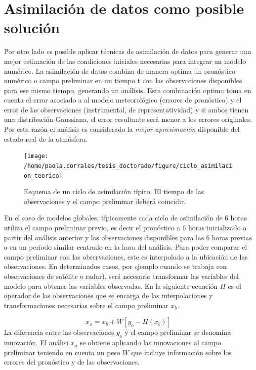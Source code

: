 \documentclass[12pt,twoside]{reedthesis}
\begin{document}
\hypertarget{asimilaciuxf3n-de-datos-como-posible-soluciuxf3n}{%
\section{Asimilación de datos como posible solución}\label{asimilaciuxf3n-de-datos-como-posible-soluciuxf3n}}

Por otro lado es posible aplicar técnicas de asimilación de datos para generar una mejor estimación de las condiciones iniciales necesarias para integrar un modelo numérico. La asimilación de datos combina de manera optima un pronóstico numérico o campo preliminar en un tiempo t con las observaciones disponibles para ese mismo tiempo, generando un análisis. Esta combinación optima toma en cuenta el error asociado a al modelo meteorológico (errores de pronóstico) y el error de las observaciones (instrumental, de representatividad) y si ambos tienen una distribución Gaussiana, el error resultante será menor a los errores originales. Por esta razón el análisis es considerado la \emph{mejor aproximación} disponible del estado real de la atmósfera.


\begin{figure}

{\centering \texttt{[image: /home/paola.corrales/tesis\_doctorado/figure/ciclo\_asimilacion\_teorico]} 

}

\caption{Esquema de un ciclo de asimilación típico. El tiempo de las observaciones y el campo preliminar deberá coincidir.}\label{fig:ciclo-asimilacion-teorico}
\end{figure}
En el caso de modelos globales, típicamente cada ciclo de asimilación de 6 horas utiliza el campo preliminar previo, es decir el pronóstico a 6 horas inicializado a partir del análisis anterior y las observaciones disponibles para las 6 horas previas o en un periodo similar centrado en la hora del análisis.
Para poder comparar el campo preliminar con las observaciones, este es interpolado a la ubicación de las observaciones. En determinados casos, por ejemplo cuando se trabaja con observaciones de satélite o radar), será necesario transformar las variables del modelo para obtener las variables observadas. En la siguiente ecuación \(H\) es el operador de las observaciones que se encarga de las interpolaciones y transformaciones necesarias sobre el campo preliminar \(x_b\).

\[ x_a = x_b + W[y_o - H(x_b )] \]
La diferencia entre las observaciones \(y_o\) y el campo preliminar se denomina innovación. El análisi \(x_a\) se obtiene aplicando las innovaciones al campo preliminar teniendo en cuenta un peso \(W\) que incluye información sobre los errores del pronóstico y de las observaciones.
\end{document}
